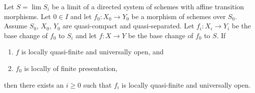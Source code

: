 \begin{lemma}
\label{lemma-descend-quasi-finite-universally-open}
Let $S = \lim S_i$ be a limit of a directed system of schemes
with affine transition morphisms.
Let $0 \in I$ and let $f_0 : X_0 \to Y_0$ be a morphism of schemes over $S_0$.
Assume $S_0$, $X_0$, $Y_0$ are quasi-compact and quasi-separated.
Let $f_i : X_i \to Y_i$ be the base change of $f_0$ to $S_i$ and
let $f : X \to Y$ be the base change of $f_0$ to $S$.
If
\begin{enumerate}
\item $f$ is locally quasi-finite and universally open, and
\item $f_0$ is locally of finite presentation,
\end{enumerate}
then there exists an $i \geq 0$ such that $f_i$ is locally quasi-finite
and universally open.
\end{lemma}

